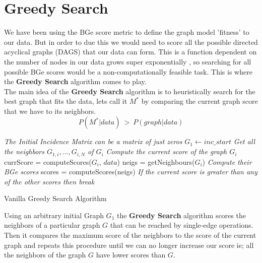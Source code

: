 \documentclass{article}
\begin{document}
	\section{Greedy Search}
	We have been using the BGe score metric to define the graph model 'fitness'
	to our data. But in order to due this we would need to score all the possible
	directed acyclical graphs (DAGS) that our data can form. This is a function
	dependent on the number of nodes in our data grows super exponentially
	\cite{bnsBasics}, so searching for all possible BGe scores would be a
	non-computationally feasible task. This is where the \textbf{Greedy Search}
	algorithm comes to play. 
	\\
	The main idea of the \textbf{Greedy Search} algorithm is to heuristically
	search for the best graph that fits the data, lets call it $M^{*}$ by
	comparing the current graph score that we have to its neighbors.
	\begin{equation}
		P(M^{*}|data) \ > \ P(graph | data)
	\end{equation}
	\begin{algorithm}[H]
	\SetAlgoLined
	\emph{The Initial Incidence Matrix can be a matrix of just zeros}\;
	$G_{1} \gets inc\_start$\;	
	\emph{Get all the neighbors $G_{1,i},\dots,G_{i,N}$ of $G_{i}$}\;	
	 {
	\emph{Compute the current score of the graph $G_{i}$}\;
	currScore = computeScores($G_{i}$, $data$)\;
	neigs = getNeighbours($G_i$)\;	
	\emph{Compute their BGe scores}\;
	scores = computeScores(neigs)\;
	\emph{If the current score is greater than any of the other scores then
	break}\;
	}
	\caption{Vanilla Greedy Search Algorithm}
	\label{alg:greedy}
	\end{algorithm}		
	Using an arbitrary initial Graph $G_{1}$ the \textbf{Greedy Search} algorithm
	scores the neighbors of a particular
	graph $G$ that can be reached by single-edge operations. Then it compares the
	maximum score of the neighbors to the score of the current graph and repeats
	this procedure until we can no longer increase our score ie; all the
	neighbors of the graph $G$ have lower scores than $G$.
\end{document}
